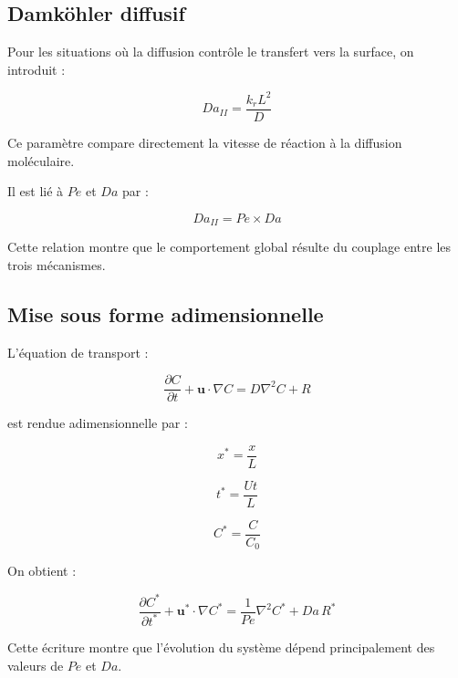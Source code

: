 \documentclass[12pt,a4paper]{report}
\begin{document}
\subsection{Damköhler diffusif}

Pour les situations où la diffusion contrôle le transfert vers la surface, on introduit :

\begin{equation}
Da_{II}
=
\frac{k_rL^2}{D}
\end{equation}

Ce paramètre compare directement la vitesse de réaction à la diffusion moléculaire.

Il est lié à $Pe$ et $Da$ par :

\begin{equation}
Da_{II}
=
Pe \times Da
\end{equation}

Cette relation montre que le comportement global résulte du couplage entre les trois mécanismes.

\subsection{Mise sous forme adimensionnelle}

L’équation de transport :

\begin{equation}
\frac{\partial C}{\partial t}
+
\mathbf{u}\cdot\nabla C
=
D\nabla^2C
+
R
\end{equation}

est rendue adimensionnelle par :

\begin{equation}
x^{*}
=
\frac{x}{L}
\end{equation}

\begin{equation}
t^{*}
=
\frac{Ut}{L}
\end{equation}

\begin{equation}
C^{*}
=
\frac{C}{C_0}
\end{equation}

On obtient :

\begin{equation}
\frac{\partial C^{*}}{\partial t^{*}}
+
\mathbf{u}^{*}\cdot\nabla C^{*}
=
\frac{1}{Pe}\nabla^2C^{*}
+
Da\,R^{*}
\end{equation}

Cette écriture montre que l’évolution du système dépend principalement des valeurs de $Pe$ et $Da$.
\end{document}
